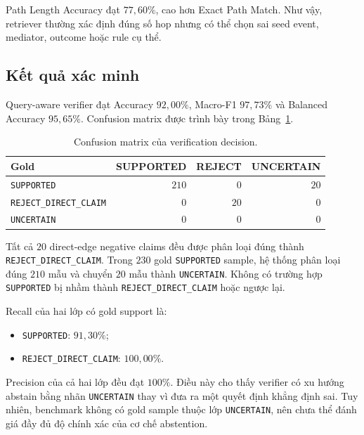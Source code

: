Path Length Accuracy đạt \(77{,}60\%\), cao hơn Exact Path Match. Như vậy,
retriever thường xác định đúng số hop nhưng có thể chọn sai seed event,
mediator, outcome hoặc rule cụ thể.

\subsection{Kết quả xác minh}

Query-aware verifier đạt Accuracy \(92{,}00\%\), Macro-F1 \(97{,}73\%\) và
Balanced Accuracy \(95{,}65\%\). Confusion matrix được trình bày trong
Bảng~\ref{tab:verification-confusion}.

\begin{table}[t]
    \centering
    \caption{Confusion matrix của verification decision.}
    \label{tab:verification-confusion}
    \begin{tabular}{lrrr}
        \hline
        \textbf{Gold} &
        \textbf{SUPPORTED} &
        \textbf{REJECT} &
        \textbf{UNCERTAIN} \\
        \hline
        \texttt{SUPPORTED} & \(210\) & \(0\) & \(20\) \\
        \texttt{REJECT\_DIRECT\_CLAIM} & \(0\) & \(20\) & \(0\) \\
        \texttt{UNCERTAIN} & \(0\) & \(0\) & \(0\) \\
        \hline
    \end{tabular}
\end{table}

Tất cả \(20\) direct-edge negative claims đều được phân loại đúng thành
\texttt{REJECT\_DIRECT\_CLAIM}. Trong \(230\) gold
\texttt{SUPPORTED} sample, hệ thống phân loại đúng \(210\) mẫu và chuyển
\(20\) mẫu thành \texttt{UNCERTAIN}. Không có trường hợp
\texttt{SUPPORTED} bị nhầm thành \texttt{REJECT\_DIRECT\_CLAIM} hoặc ngược
lại.

Recall của hai lớp có gold support là:

\begin{itemize}
    \item \texttt{SUPPORTED}: \(91{,}30\%\);
    \item \texttt{REJECT\_DIRECT\_CLAIM}: \(100{,}00\%\).
\end{itemize}

Precision của cả hai lớp đều đạt \(100\%\). Điều này cho thấy verifier có xu
hướng abstain bằng nhãn \texttt{UNCERTAIN} thay vì đưa ra một quyết định
khẳng định sai. Tuy nhiên, benchmark không có gold sample thuộc lớp
\texttt{UNCERTAIN}, nên chưa thể đánh giá đầy đủ độ chính xác của cơ chế
abstention.

